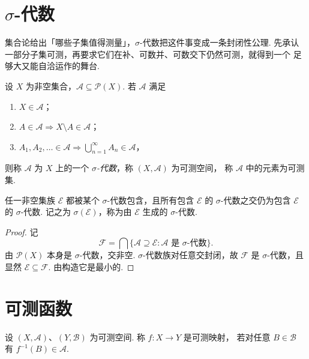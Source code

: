 \section{$\sigma$-代数}

\begin{wenxintishi}[本章在做什么]
集合论给出「哪些子集值得测量」，$\sigma$-代数把这件事变成一条封闭性公理.
先承认一部分子集可测，再要求它们在补、可数并、可数交下仍然可测，就得到一个
足够大又能自洽运作的舞台.
\end{wenxintishi}

\begin{definition}[$\sigma$-代数]
设 $X$ 为非空集合，$\mathcal{A}\subseteq\mathcal{P}(X)$. 若 $\mathcal{A}$ 满足
\begin{enumerate}[label=\roman*.]
  \item $X\in\mathcal{A}$；
  \item $A\in\mathcal{A}\Rightarrow X\setminus A\in\mathcal{A}$；
  \item $A_1,A_2,\dots\in\mathcal{A}\Rightarrow \bigcup_{n=1}^{\infty}A_n\in\mathcal{A}$，
\end{enumerate}
则称 $\mathcal{A}$ 为 $X$ 上的一个 \emph{$\sigma$-代数}，称 $(X,\mathcal{A})$ 为可测空间，
称 $\mathcal{A}$ 中的元素为可测集.
\end{definition}

\begin{theorem}
任一非空集族 $\mathcal{E}$ 都被某个 $\sigma$-代数包含，且所有包含 $\mathcal{E}$ 的
$\sigma$-代数之交仍为包含 $\mathcal{E}$ 的 $\sigma$-代数. 记之为
$\sigma(\mathcal{E})$，称为由 $\mathcal{E}$ 生成的 $\sigma$-代数.
\end{theorem}

\begin{proof}
记
\[
\mathcal{F}=\bigcap\{\mathcal{A}\supseteq\mathcal{E}:\mathcal{A}\text{ 是 }\sigma\text{-代数}\}.
\]
由 $\mathcal{P}(X)$ 本身是 $\sigma$-代数，交非空. $\sigma$-代数族对任意交封闭，故
$\mathcal{F}$ 是 $\sigma$-代数，且显然 $\mathcal{E}\subseteq\mathcal{F}$. 由构造它是最小的.
\end{proof}

\section{可测函数}

\begin{definition}[可测映射]
设 $(X,\mathcal{A})$、$(Y,\mathcal{B})$ 为可测空间. 称 $f:X\to Y$ 是可测映射，
若对任意 $B\in\mathcal{B}$ 有 $f^{-1}(B)\in\mathcal{A}$.
\end{definition}

